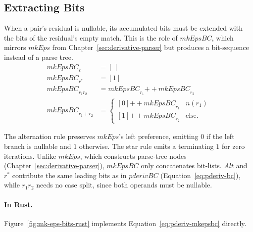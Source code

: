 %
%
%

\subsection{Extracting Bits}
\label{sec:pderiv-bc-mkeps}

When a pair's residual is nullable, its accumulated bits must be
extended with the bits of the residual's empty match. This is the role of
$\mathit{mkEpsBC}$, which mirrors $\mathit{mkEps}$ from
Chapter~\ref{sec:derivative-parser} but produces a bit-sequence instead of a
parse tree.
\begin{equation}\label{eq:pderiv-mkepsbc}
\begin{aligned}
\mathit{mkEpsBC}_{\varepsilon} &= [\,] \\
\mathit{mkEpsBC}_{r^{*}} &= [1] \\
\mathit{mkEpsBC}_{r_1 r_2} &=
  \mathit{mkEpsBC}_{r_1} \mathbin{+\!\!+} \mathit{mkEpsBC}_{r_2} \\
\mathit{mkEpsBC}_{r_1 + r_2} &=
  \begin{cases}
    [0] \mathbin{+\!\!+} \mathit{mkEpsBC}_{r_1} & n(r_1) \\
    [1] \mathbin{+\!\!+} \mathit{mkEpsBC}_{r_2} & \text{else.}
  \end{cases}
\end{aligned}
\end{equation}

The alternation rule preserves $\mathit{mkEps}$'s left preference,
emitting $0$ if the left branch is nullable and $1$ otherwise.
The star rule emits a terminating $1$ for zero iterations.
Unlike $\mathit{mkEps}$, which constructs parse-tree nodes
(Chapter~\ref{sec:derivative-parser}),
$\mathit{mkEpsBC}$ only concatenates bit-lists.
$\mathit{Alt}$ and $r^{*}$ contribute the same leading bits
as in $\mathit{pderivBC}$ (Equation~\eqref{eq:pderiv-bc}),
while $r_1 r_2$ needs no case split, since both operands
must be nullable.

%

\paragraph{In Rust.}
\label{sec:mk-eps-bits-impl}

Figure~\ref{fig:mk-eps-bits-rust} implements Equation~\eqref{eq:pderiv-mkepsbc} directly.

